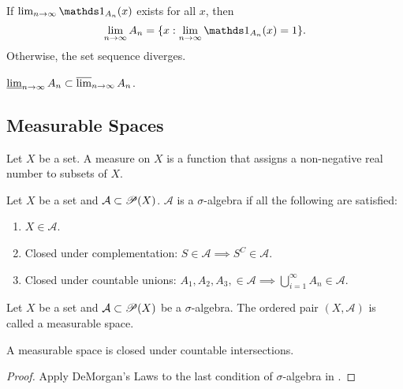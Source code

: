 \documentclass[class=book, crop=false]{standalone}
\begin{document}
        \begin{corollary}
            If $\lim_{n \rightarrow \infty} \indic_{A_n}(x)$ exists for all $x$, then
            \begin{equation*}
                \lim_{n \rightarrow \infty} A_n = \{x : \lim_{n \rightarrow \infty} \indic_{A_n}(x) = 1\}.
            \end{equation*}
            Otherwise, the set sequence diverges.
        \end{corollary}
        
        \begin{theorem}
            $\varliminf_{n \rightarrow \infty} A_n \subset \varlimsup_{n \rightarrow \infty} A_n$.
        \end{theorem}


        \subsection{Measurable Spaces}
        \begin{definition}[Measure]
            Let $X$ be a set. A measure on $X$ is a function that assigns a non-negative real number to subsets of $X$.
        \end{definition}
        
        \begin{definition} \label{def:sigma-algebra}
            Let $X$ be a set and $\mathcal{A} \subset \mathscr{P}(X)$. $\mathcal{A}$ is a $\sigma$-algebra if all the following are satisfied:
            \begin{enumerate}
                \item $X \in \mathcal{A}$.
                \item Closed under complementation: $S \in \mathcal{A} \implies S^C \in \mathcal{A}$.
                \item Closed under countable unions: $A_1, A_2, A_3, \in \mathcal{A} \implies \bigcup^{\infty}_{i = 1} A_n \in \mathcal{A}$.
            \end{enumerate}
        \end{definition}
        
        \begin{definition}
            Let $X$ be a set and $\mathcal{A} \subset \mathscr{P}(X)$ be a $\sigma$-algebra. The ordered pair $(X, \mathcal{A})$ is called a measurable space.
        \end{definition}
        
        \begin{theorem}
            A measurable space is closed under countable intersections.
        \end{theorem}
        \begin{proof}
            Apply DeMorgan's Laws to the last condition of $\sigma$-algebra in .
        \end{proof}
\end{document}
